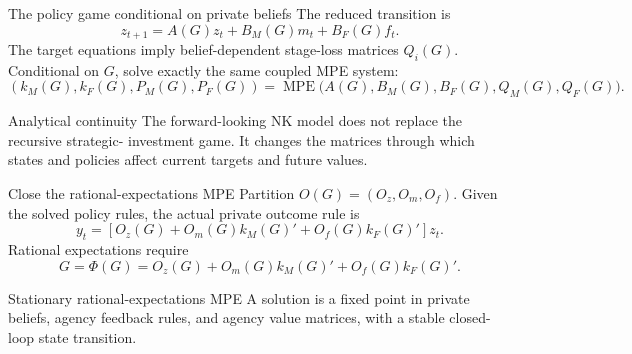 \documentclass[10pt,aspectratio=169]{beamer}
\begin{document}
\begin{frame}{The policy game conditional on private beliefs}
The reduced transition is
\begin{equation*}
z_{t+1}=A(G)z_t+B_M(G)m_t+B_F(G)f_t.
\end{equation*}
The target equations imply belief-dependent stage-loss matrices $Q_i(G)$.
Conditional on $G$, solve exactly the same coupled MPE system:
\begin{equation*}
(k_M(G),k_F(G),P_M(G),P_F(G))
=\operatorname{MPE}\bigl(A(G),B_M(G),B_F(G),Q_M(G),Q_F(G)\bigr).
\end{equation*}
\begin{block}{Analytical continuity}
The forward-looking NK model does not replace the recursive strategic-
investment game. It changes the matrices through which states and policies
affect current targets and future values.
\end{block}
\end{frame}

\begin{frame}{Close the rational-expectations MPE}
Partition $O(G)=(O_z,O_m,O_f)$. Given the solved policy rules, the actual
private outcome rule is
\begin{equation*}
y_t=\left[O_z(G)+O_m(G)k_M(G)'+O_f(G)k_F(G)'\right]z_t.
\end{equation*}
Rational expectations require
\begin{equation*}
\boxed{G=\Phi(G)
=O_z(G)+O_m(G)k_M(G)'+O_f(G)k_F(G)'.}
\end{equation*}
\begin{alertblock}{Stationary rational-expectations MPE}
A solution is a fixed point in private beliefs, agency feedback rules, and
agency value matrices, with a stable closed-loop state transition.
\end{alertblock}
\end{frame}
\end{document}
